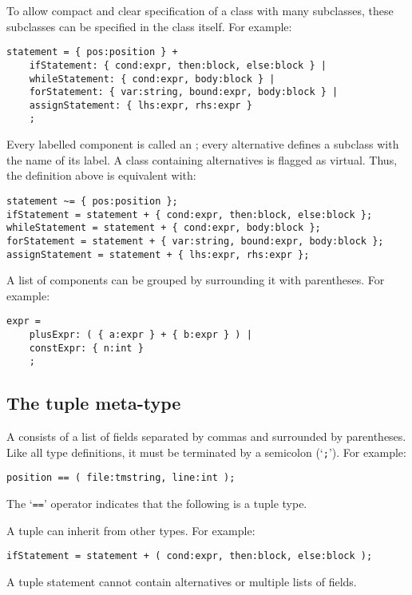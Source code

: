 To allow compact and clear specification of a class with many
subclasses, these subclasses can be specified in the class itself.
For example:
\begin{showfile}
\begin{verbatim}
statement = { pos:position } +
    ifStatement: { cond:expr, then:block, else:block } |
    whileStatement: { cond:expr, body:block } |
    forStatement: { var:string, bound:expr, body:block } |
    assignStatement: { lhs:expr, rhs:expr }
    ;
\end{verbatim}
\end{showfile}
Every labelled component is called an ;
every alternative defines a subclass with the name of its label.
A class containing alternatives is flagged as virtual.
Thus, the definition above is equivalent with:
\begin{showfile}
\begin{verbatim}
statement ~= { pos:position };
ifStatement = statement + { cond:expr, then:block, else:block };
whileStatement = statement + { cond:expr, body:block };
forStatement = statement + { var:string, bound:expr, body:block };
assignStatement = statement + { lhs:expr, rhs:expr };
\end{verbatim}
\end{showfile}

A list of components can be grouped by surrounding it with parentheses.
For example:
\begin{showfile}
\begin{verbatim}
expr =
    plusExpr: ( { a:expr } + { b:expr } ) |
    constExpr: { n:int }
    ;
\end{verbatim}
\end{showfile}
\subsection{The tuple meta-type}
A  consists of a list of fields separated by commas and
surrounded by parentheses.
Like all type definitions, it must be terminated by a semicolon (`\verb';'').
For example:
\begin{showfile}
\begin{verbatim}
position == ( file:tmstring, line:int );
\end{verbatim}
\end{showfile}
The `\verb'=='' operator indicates that the following is a tuple type.

A tuple can inherit from other types. For example:
\begin{showfile}
\begin{verbatim}
ifStatement = statement + ( cond:expr, then:block, else:block );
\end{verbatim}
\end{showfile}
A tuple statement cannot contain alternatives or multiple lists of fields.

